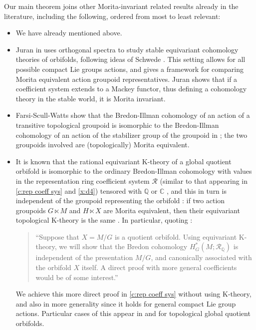 \documentclass[12pt,reqno]{amsart}
\newcommand{\calR}{{\mathcal{R}}}
\newcommand{\CC}{{\mathbb{C}}}  %
\newcommand{\QQ}{{\mathbb{Q}}}  %
\theoremstyle{plain}
\theoremstyle{definition}
\begin{document}
 Our main theorem joins other Morita-invariant related results already in the literature,  including the following, ordered from most to least relevant:   
    \begin{itemize}
        \item We have already mentioned \cite{PS:translation} above.
        \item Juran in \cite{juran} uses orthogonal spectra to study stable equivariant cohomology theories of orbifolds, following ideas of  Schwede \cite{Schwede1, Schwede2}.  This setting allows for all possible compact Lie groups actions, and gives a framework for comparing Morita equivalent action groupoid representatives. 
  Juran shows that if a coefficient system extends to a Mackey functor, thus defining a cohomology theory in the stable world,     it is Morita invariant.  
        \item Farsi-Scull-Watts show that the Bredon-Illman cohomology of an action of a transitive topological groupoid is isomorphic to the Bredon-Illman cohomology of an action of the stabilizer group of the groupoid in \cite{FSW:transitive}; the two groupoids involved are (topologically) Morita equivalent. 
      
        \item It is known that the rational equivariant K-theory of a global quotient orbifold is isomorphic to the ordinary Bredon-Illman cohomology with values in the representation ring coefficient system $\calR$ (similar to that appearing in \cref{c:rep coeff sys} and \cref{x:d4}) tensored with $\QQ$ or $\CC$ \cite{moerdijk:orbifolds,luck-oliver}, and this in turn is independent of the groupoid representing the orbifold \cite{AdemRuanTw}:  if two action groupoids $G\ltimes M$ and $H\ltimes X$ are 
Morita equivalent, then their equivariant topological K-theory is the same  \cite{Blackadar}.    In particular, quoting \cite[page 540]{AdemRuanTw}:
        \begin{quote}
            ``Suppose that $X = M/G$ is a quotient orbifold. Using equivariant K-theory, we will show that the Bredon cohomology $H_G^*(M;\calR_\QQ)$ is independent of the
            presentation $M/G$, and canonically associated with the orbifold $X$ itself. A direct proof with more general coefficients would be of some interest.'' 
        \end{quote}
        We achieve this more direct proof in \cref{c:rep coeff sys} without using K-theory, and also in more generality since it holds for general compact Lie group actions.  Particular cases of this appear in \cite{PS:translation} and \cite{juran} for topological global quotient orbifolds.



\end{itemize}
\end{document}
